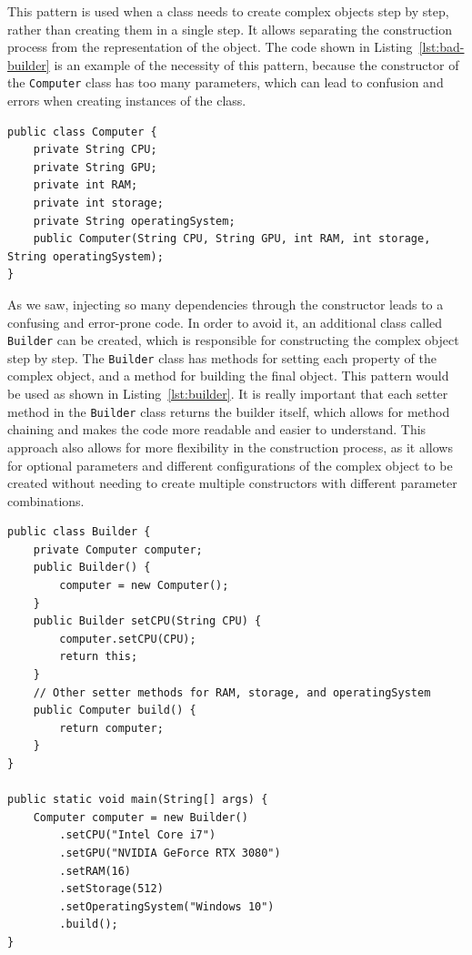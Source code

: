 This pattern is used when a class needs to create complex objects step by step, rather than creating them in a single step. It allows separating the construction process from the representation of the object. The code shown in Listing~\ref{lst:bad-builder} is an example of the necessity of this pattern, because the constructor of the \texttt{Computer} class has too many parameters, which can lead to confusion and errors when creating instances of the class.
\begin{listing}
    \begin{verbatim}
public class Computer {
    private String CPU;
    private String GPU;
    private int RAM;
    private int storage;
    private String operatingSystem;
    public Computer(String CPU, String GPU, int RAM, int storage, String operatingSystem);
}
    \end{verbatim}
    \caption{Example of a class with a constructor that has too many parameters.}
    \label{lst:bad-builder}
\end{listing}

As we saw, injecting so many dependencies through the constructor leads to a confusing and error-prone code. In order to avoid it, an additional class called \texttt{Builder} can be created, which is responsible for constructing the complex object step by step. The \texttt{Builder} class has methods for setting each property of the complex object, and a method for building the final object. This pattern would be used as shown in Listing~\ref{lst:builder}. It is really important that each setter method in the \texttt{Builder} class returns the builder itself, which allows for method chaining and makes the code more readable and easier to understand. This approach also allows for more flexibility in the construction process, as it allows for optional parameters and different configurations of the complex object to be created without needing to create multiple constructors with different parameter combinations.
\begin{listing}
    \begin{verbatim}
public class Builder {
    private Computer computer;
    public Builder() {
        computer = new Computer();
    }
    public Builder setCPU(String CPU) {
        computer.setCPU(CPU);
        return this;
    }
    // Other setter methods for RAM, storage, and operatingSystem
    public Computer build() {
        return computer;
    }
}

public static void main(String[] args) {
    Computer computer = new Builder()
        .setCPU("Intel Core i7")
        .setGPU("NVIDIA GeForce RTX 3080")
        .setRAM(16)
        .setStorage(512)
        .setOperatingSystem("Windows 10")
        .build();
}
    \end{verbatim}
    \caption{Example of using the Builder pattern to create a complex object.}
    \label{lst:builder}
\end{listing}


